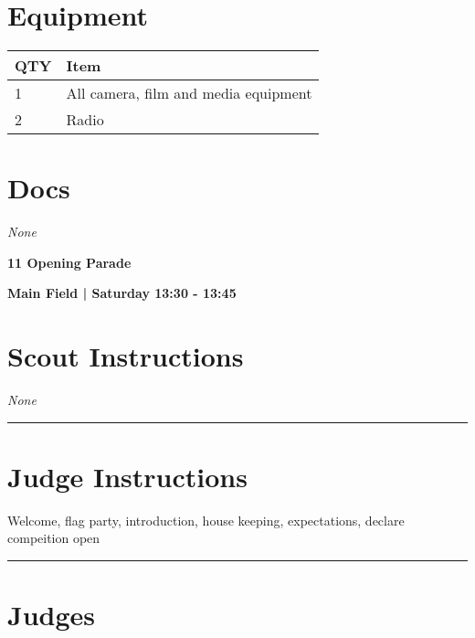 \documentclass[10pt]{article}
\newcommand{\newtitle}[1]{\begin{center}{\Huge\bfseries #1 }\\ \vspace{5mm}\end{center}}
\newcommand{\newsubtitle}[1]{\begin{center}{\color{grey}\Large\bfseries #1 }\\ \vspace{5mm}\end{center}}
\begin{document}
	\begin{multicols}{2}

		\section*{\faWrench \: Equipment}

		
	\begin{center}
			\begin{tabular}{p{2cm}p{4cm}}


				\textbf{QTY} & \textbf{Item} \\\toprule
												1&All camera, film and media equipment\\\midrule
												2&Radio\\\midrule
								\end{tabular}

			\end{center}

		
		\vfill\null
		\columnbreak

			\section*{\faFile \: Docs}
		 	\textit{None}
	

		\vfill\null

		\end{multicols}



	\vspace{1cm}


	\clearpage
		\newtitle{11 Opening Parade }
	\newsubtitle{Main Field | Saturday 13:30 - 13:45}
		\setcounter{section}{10}
	\section*{Scout Instructions}
		\textit{None}
	
	\vspace{0.5cm}
	\hrule
	\vspace{0.5cm}

		\section*{Judge Instructions}
		Welcome, flag party, introduction, house keeping, expectations, declare compeition open
\vspace{0.5cm}
	\hrule
	\vspace{0.5cm}
		\section*{\faUsers \: Judges}
\end{document}
